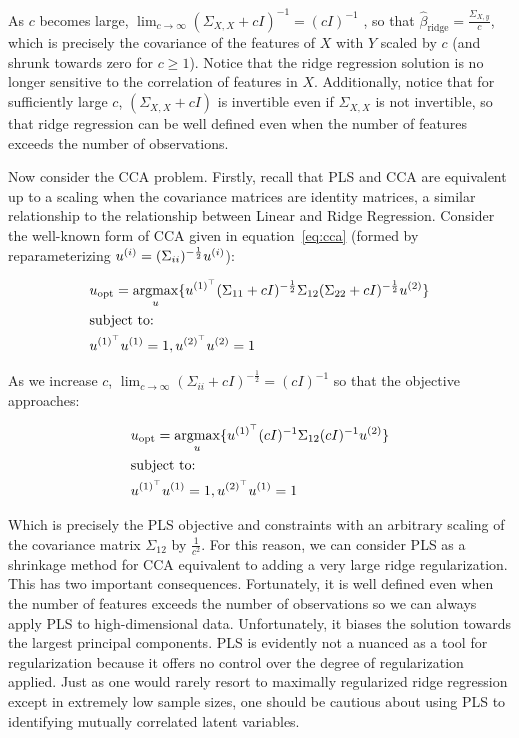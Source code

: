 As $c$ becomes large, $\lim_{c \to \infty} (\Sigma_{X,X} + c I)^{-1} = (c I)^{-1}$
, so that $\hat{\beta}_{\text{ridge}}=\frac{\Sigma_{X,y}}{c}$, which is precisely the covariance of the features of $X$ with $Y$ scaled by $c$ (and shrunk towards zero for $c \geq 1$).
Notice that the ridge regression solution is no longer sensitive to the correlation of features in $X$.
Additionally, notice that for sufficiently large $c$, $(\Sigma_{X,X} + c I)$ is invertible even if $\Sigma_{X,X}$ is not invertible, so that ridge regression can be well defined even when the number of features exceeds the number of observations.

Now consider the CCA problem.
Firstly, recall that PLS and CCA are equivalent up to a scaling when the covariance matrices are identity matrices, a similar relationship to the relationship between Linear and Ridge Regression.
Consider the well-known form of CCA given in equation~\ref{eq:cca}\citep{mihalik2022canonical} (formed by reparameterizing \(u^{(i)}=(\Sigma_{ii})^{-\frac{1}{2}}u^{(i)}\)):

\begin{align}\label{eq:cca}
     & u_{\text{opt}}=\underset{u}{\mathrm{argmax}}\{ u^{(1)^{\top}}(\Sigma_{11}+ c I)^{-\frac{1}{2}}\Sigma_{12}(\Sigma_{22}+c I)^{-\frac{1}{2}}u^{(2)} \} \\
     & \text{subject to:} \notag \\
     & u^{(1)^{\top}}u^{(1)}=1, u^{(2)^{\top}}u^{(2)}=1 \notag
\end{align}

As we increase $c$, $\lim_{c \to \infty} (\Sigma_{ii}+ c I)^{-\frac{1}{2}}= (c I)^{-1}$ so that the objective approaches:

\begin{align}
     & u_{\text{opt}}=\underset{u}{\mathrm{argmax}}\{ u^{(1)^{\top}}(c I)^{-1}\Sigma_{12}(c I)^{-1}u^{(2)} \} \\
        & \text{subject to:} \notag \\
        & u^{(1)^{\top}}u^{(1)}=1, u^{(2)^{\top}}u^{(1)}=1 \notag
\end{align}

Which is precisely the PLS objective and constraints with an arbitrary scaling of the covariance matrix $\Sigma_{12}$ by $\frac{1}{c^2}$.
For this reason, we can consider PLS as a shrinkage method for CCA equivalent to adding a very large ridge regularization.
This has two important consequences.
Fortunately, it is well defined even when the number of features exceeds the number of observations so we can always apply PLS to high-dimensional data.
Unfortunately, it biases the solution towards the largest principal components.
PLS is evidently not a nuanced as a tool for regularization because it offers no control over the degree of regularization applied.
Just as one would rarely resort to maximally regularized ridge regression except in extremely low sample sizes, one should be cautious about using PLS to identifying mutually correlated latent variables.

